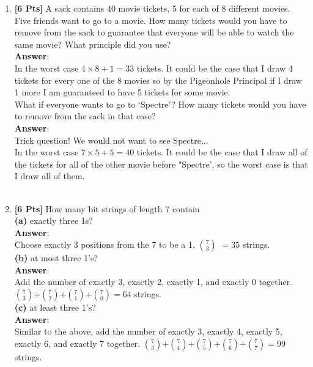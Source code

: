 \documentclass[11pt]{article}
\begin{document}
\begin{enumerate}
\item {\bf [6 Pts]} A sack contains 40 movie tickets, 5 for each of 8 different movies. Five friends want to go to a movie. How many tickets would you have to remove from the sack to guarantee that everyone will be able to watch the same movie? What principle did you use?\\
\textbf{Answer}:\\
In the worst case $4 \times 8 +1 = 33$ tickets. It could be the case that I draw 4 tickets for every one of the 8 movies so by the Pigeonhole Principal if I draw 1 more I am guaranteed to have 5 tickets for some movie.\\

 What if everyone wants to go to `Spectre'? How many tickets would you have to remove from the sack in that case?\\
\textbf{Answer}:\\

Trick question! We would not want to see Spectre...\\

In the worst case $7 \times 5 + 5 = 40$ tickets. It could be the case that I draw all of the tickets for all of the other movie before "Spectre', so the worst case is that I draw all of them.\\\\



\item {\bf [6 Pts]} How many bit strings of length 7 contain\\
\textbf{(a)} exactly three 1s?\\
\textbf{Answer}:\\ 
Choose exactly 3 positions from the 7 to be a 1. $ 7 \choose 3$ $= 35$ strings.\\

\textbf{(b)}  at most three 1's?\\
\textbf{Answer}:\\ 
Add the number of exactly 3, exactly 2, exactly 1, and exactly 0 together. $7 \choose 3$$+$$7 \choose 2$$+$$7 \choose 1$$+$$7 \choose 0$$= 64$ strings.\\

\textbf{(c)} at least three 1's?\\
\textbf{Answer}:\\
Similar to the above, add the number of exactly 3, exactly 4, exactly 5, exactly 6, and exactly 7 together. $7 \choose 3$$+$$7 \choose 4$$+$$7 \choose 5$$+$$7 \choose 6$$+$$7 \choose 7$$= 99$ strings.\\



\end{enumerate}
\end{document}
